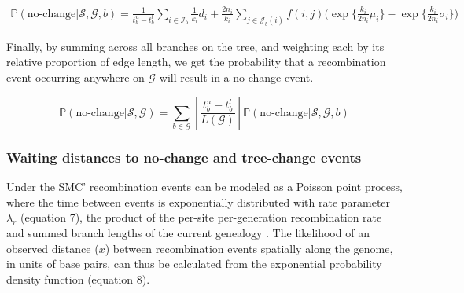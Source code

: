 \documentclass[11pt]{article}
\begin{document}

\begin{equation}
\begin{aligned}
	\mathbb{P}(\textrm{no-change} | \mathcal{S},\mathcal{G},b) = 
	\frac{1}{t_b^u - t_b^l}
	\sum_{i \in \mathcal{I}_b} \frac{1}{k_i} d_i + 
	\frac{2n_i}{k_i} 
	\sum_{j \in \mathcal{J}_b(i)}f(i,j)
	\bigg(
		\exp\bigg\{\frac{k_i}{2n_i}\mu_i \bigg\} - 
		\exp\bigg\{\frac{k_i}{2n_i}\sigma_i \bigg\}
	\bigg)
\end{aligned}
\end{equation}


\noindent Finally, by summing across all branches on the tree,
and weighting each by its relative proportion of edge length,
we get the probability that a recombination event occurring anywhere on 
$\mathcal{G}$ will result in a no-change event. %

\begin{equation}
	\mathbb{P}(\text{no-change} | \mathcal{S},\mathcal{G}) = 
	\sum_{b \in \mathcal{G}}
	\left[\frac{t^u_b - t^l_b}{L(\mathcal{G})}\right]
	\mathbb{P}(\text{no-change} | \mathcal{S},\mathcal{G},b)
\end{equation}


\subsubsection{Waiting distances to no-change and tree-change events}
Under the SMC' recombination events can be modeled as a Poisson point 
process, where the time between events is exponentially distributed 
with rate parameter $\lambda_r$ (equation 7), the product of the per-site
per-generation recombination rate and summed branch lengths of
the current genealogy \citep{wiuf_recombination_1999}. 
The likelihood of an observed distance ($x$) between recombination
events spatially along the genome, in units of base pairs, can thus 
be calculated from the exponential probability density function 
(equation 8).
\end{document}
